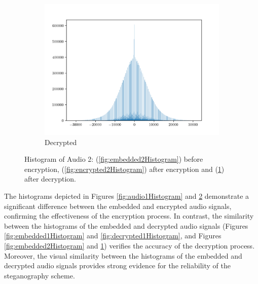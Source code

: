 \documentclass[a4paper]{cas-sc}
\begin{document}
\begin{figure}[pos=h]
\begin{subfigure}[h]{0.3\textwidth}
\begin{center}
        \end{center}
    \end{subfigure}
    \begin{subfigure}[h]{0.3\textwidth}
        \begin{center}
            \includegraphics[width=\textwidth]{decrypted2Histogram.png}
            \caption{Decrypted}
            \label{fig:decrypted2Histogram}
        \end{center}
    \end{subfigure}
    \caption{Histogram of Audio 2: (\ref{fig:embedded2Histogram}) before encryption, (\ref{fig:encrypted2Histogram}) after encryption and (\ref{fig:decrypted2Histogram}) after decryption.}
    \label{fig:audio2Histogram}
\end{figure}
The histograms depicted in Figures \ref{fig:audio1Histogram} and \ref{fig:audio2Histogram} demonstrate a significant difference between the embedded and encrypted audio signals, confirming the effectiveness of the encryption process. In contrast, the similarity between the histograms of the embedded and decrypted audio signals (Figures \ref{fig:embedded1Histogram} and \ref{fig:decrypted1Histogram}, and Figures \ref{fig:embedded2Histogram} and \ref{fig:decrypted2Histogram}) verifies the accuracy of the decryption process. Moreover, the visual similarity between the histograms of the embedded and decrypted audio signals provides strong evidence for the reliability of the steganography scheme.
\end{document}

